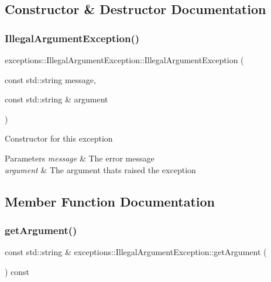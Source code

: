 \subsection{Constructor \& Destructor Documentation}
\mbox{\label{classexceptions_1_1IllegalArgumentException_a299c4dc8ad0df639a618ced7799001ff}} 
\subsubsection{\texorpdfstring{Illegal\+Argument\+Exception()}{IllegalArgumentException()}}
{\footnotesize\ttfamily exceptions\+::\+Illegal\+Argument\+Exception\+::\+Illegal\+Argument\+Exception (\begin{DoxyParamCaption}\item[{const std\+::string}]{message,  }\item[{const std\+::string \&}]{argument }\end{DoxyParamCaption})}

Constructor for this exception 
\begin{DoxyParams}{Parameters}
{\em message} & The error message \\
\hline
{\em argument} & The argument that\textquotesingle{}s raised the exception \\
\hline
\end{DoxyParams}


\subsection{Member Function Documentation}
\mbox{\label{classexceptions_1_1IllegalArgumentException_a9228ab515c25921dc0e5c68e54fb2104}} 
\subsubsection{\texorpdfstring{get\+Argument()}{getArgument()}}
{\footnotesize\ttfamily const std\+::string \& exceptions\+::\+Illegal\+Argument\+Exception\+::get\+Argument (\begin{DoxyParamCaption}{ }\end{DoxyParamCaption}) const}

